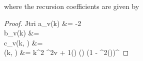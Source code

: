 \documentclass[modern]{aastex62}
\begin{document}
%
where the recursion coefficients are given by
%
\begin{proof}{Jtri}
    \label{eq:Jtri_coeffs}
    a_v(k) &= -2 \nonumber \\
    b_v(k) &=  \nonumber \\
    c_v(k, \kap) &=  \nonumber \\
    (k, \kap) &= 
        k^2 
        \sin^{2v + 1}\left(\right) 
        \cos\left(\right) 
        \bigg(1 - \kmt \sin^2\left(\right)\bigg)^
\end{proof}


\end{document}
